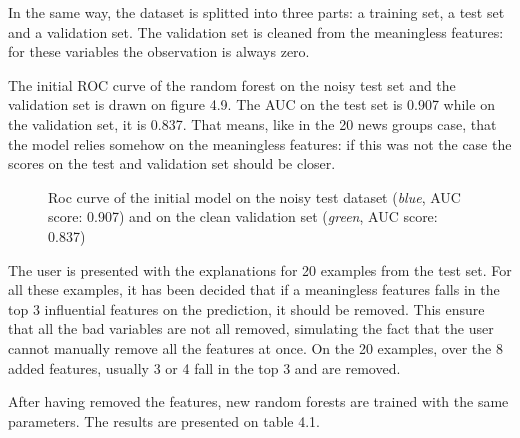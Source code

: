 \documentclass[a4paper,11pt]{kth-mag}
\begin{document}
In the same way, the dataset is splitted into three parts: a training set, a test set and a validation set. The validation set is cleaned from the meaningless features: for these variables the observation is always zero.

The initial ROC curve of the random forest on the noisy test set and the validation set is drawn on figure 4.9. The AUC on the test set is 0.907 while on the validation set, it is 0.837. That means, like in the 20 news groups case, that the model relies somehow on the meaningless features: if this was not the case the scores on the test and validation set should be closer.

\begin{figure}[h!]
		\centering
    	\def\svgwidth{\columnwidth}
    	\resizebox{0.6\textwidth}{!}{}
    	\caption{Roc curve of the initial model on the noisy test dataset (\textit{blue}, AUC score: 0.907) and on the clean validation set (\textit{green}, AUC score: 0.837)}
\end{figure}

The user is presented with the explanations for 20 examples from the test set. For all these examples, it has been decided that if a meaningless features falls in the top 3 influential features on the prediction, it should be removed. This ensure that all the bad variables are not all removed, simulating the fact that the user cannot manually remove all the features at once. On the 20 examples, over the 8 added features, usually 3 or 4 fall in the top 3 and are removed.

After having removed the features, new random forests are trained with the same parameters. The results are presented on table 4.1.
\end{document}
